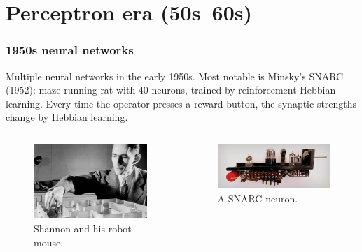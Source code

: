 \documentclass{beamer}
\begin{document}
\section{Perceptron era (50s--60s)}

\begin{frame}
\frametitle{1950s neural networks}
Multiple neural networks in the early 1950s. Most notable is Minsky's SNARC (1952): maze-running rat with 40 neurons, trained by reinforcement Hebbian learning. Every time the operator presses a reward button, the synaptic strengths change by Hebbian learning.

\begin{columns}
    \begin{column}{0.5\textwidth}
    \begin{figure}[t]
        \includegraphics[width=\textwidth]{figure/Shannon_mouse_robot.jpg}
        \centering
        \caption{Shannon and his robot mouse.}
    \end{figure}
    \end{column}
    \begin{column}{0.5\textwidth}
        \begin{figure}[t]
            \includegraphics[width=\textwidth]{figure/SNARC_neuron.jpg}
            \centering
            \caption{A SNARC neuron.}
        \end{figure}        
    \end{column}
\end{columns}
\end{frame}
\end{document}
